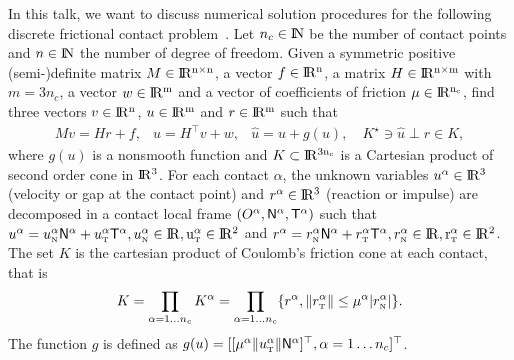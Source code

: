 \documentclass[11pt,a4paper]{article}
\newcommand{\RR}{\ensuremath{\rm I\!R}}
\newcommand{\NN}{\ensuremath{\rm I\!N}}
\def\n{{\hbox{\tiny{N}}}}
\def\t{{\hbox{\tiny{T}}}}
\begin{document}
In this talk, we want to discuss numerical solution procedures for the following discrete frictional contact problem~\cite{Acary.Brogliato2008}.   Let $n_c\in \NN$ be the number of contact points and $n\in\NN$ the number of degree of freedom. Given a symmetric positive (semi-)definite matrix ${M} \in \RR^{n \times n}$, a vector $ {f} \in \RR^n$, a matrix  ${H} \in \RR^{n \times m}$ with $m= 3n_c$, a vector $w \in \RR^{m}$ and a vector of coefficients of friction $\mu \in \RR^{n_c}$, find three vectors $ {v} \in \RR^n$, $u\in\RR^m$ and $r\in \RR^m$ such that
\begin{equation}\label{eq:soccp1}
  \begin{array}{rcl}
    M v = {H} {r} + {f}, &
    u = H^\top v + w,  &
    \hat u = u + g(u), \quad 
                         K^\star \ni {\hat u} \perp r \in K,
  \end{array}
\end{equation}
where $g(u)$ is a nonsmooth function and $K\subset \RR^{3 n_c}$ is a Cartesian product of second order cone in $\RR^3$.   For each contact $\alpha$, the unknown variables  $u^\alpha\in\RR^3$ (velocity or gap at the contact point) and $r^\alpha\in\RR^3$ (reaction or impulse) are decomposed  in a contact local frame $(O^\alpha,{\sf N}^\alpha,{\sf T}^\alpha)$ such that $u^\alpha = u^\alpha_{\n} {\sf N}^\alpha +   u^{\alpha}_{\t}{\sf T}^\alpha, u^\alpha_{\n} \in \RR, u^\alpha_{\t} \in \RR^2$ and  $r^\alpha = r^\alpha_{\n} {\sf N}^\alpha +   r^{\alpha}_{\t}{\sf T}^\alpha, r^\alpha_{\n} \in \RR, r^\alpha_{\t} \in \RR^2$.
The set $K$ is the cartesian product of Coulomb's friction cone at each contact, that is
\begin{equation}
  \label{eq:CC}
  K = \prod_{\alpha=1\ldots n_c} K^{\alpha}  = \prod_{\alpha=1\ldots n_c} \{r^\alpha, \|r^\alpha_\t \| \leq \mu^\alpha |r^\alpha_\n| \}.
\end{equation}
The function $g$ is defined as $g(u) = [[\mu^\alpha  \|u^\alpha_\t\| {\sf N}^\alpha]^\top, \alpha = 1\ldots n_c]^\top$.
\end{document}

